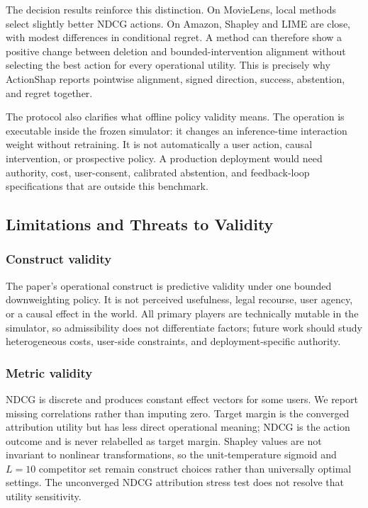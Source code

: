 \documentclass[pdflatex,sn-mathphys-num]{sn-jnl}
\begin{document}
The decision results reinforce this distinction. On MovieLens, local methods select slightly better NDCG actions. On Amazon, Shapley and LIME are close, with modest differences in conditional regret. A method can therefore show a positive change between deletion and bounded-intervention alignment without selecting the best action for every operational utility. This is precisely why ActionShap reports pointwise alignment, signed direction, success, abstention, and regret together.

The protocol also clarifies what offline policy validity means. The operation is executable inside the frozen simulator: it changes an inference-time interaction weight without retraining. It is not automatically a user action, causal intervention, or prospective policy. A production deployment would need authority, cost, user-consent, calibrated abstention, and feedback-loop specifications that are outside this benchmark.

\subsection{Limitations and Threats to Validity}
\subsubsection{Construct validity}
The paper's operational construct is predictive validity under one bounded downweighting policy. It is not perceived usefulness, legal recourse, user agency, or a causal effect in the world. All primary players are technically mutable in the simulator, so admissibility does not differentiate factors; future work should study heterogeneous costs, user-side constraints, and deployment-specific authority.

\subsubsection{Metric validity}
NDCG is discrete and produces constant effect vectors for some users. We report missing correlations rather than imputing zero. Target margin is the converged attribution utility but has less direct operational meaning; NDCG is the action outcome and is never relabelled as target margin. Shapley values are not invariant to nonlinear transformations, so the unit-temperature sigmoid and $L=10$ competitor set remain construct choices rather than universally optimal settings. The unconverged NDCG attribution stress test does not resolve that utility sensitivity.
\end{document}
